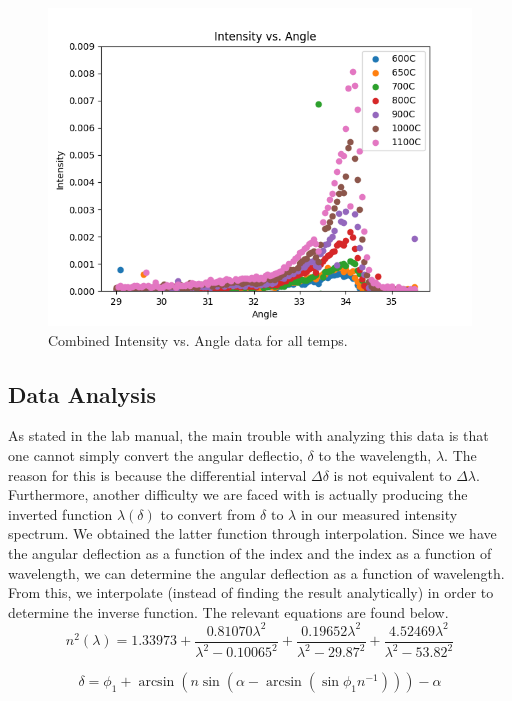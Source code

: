 \documentclass[10pt,letterpaper,onecolumn]{article}
\begin{document}
\begin{figure}[ht]
  \begin{center}
  \includegraphics*[width=4.5in]{combinedSpectra.png}
  \caption{Combined Intensity vs. Angle data for all temps.\label{fig:spectra} }
  \end{center}
 \end{figure}
 
\subsection{Data Analysis}
As stated in the lab manual, the main trouble with analyzing this data is that
one cannot simply convert the angular deflectio, $\delta$ to the 
wavelength, $\lambda$. The reason for this is because the differential interval
$\Delta \delta$ is not equivalent to $\Delta \lambda$. Furthermore, another 
difficulty we are faced with is actually producing the inverted function 
$\lambda(\delta)$ to convert from $\delta \text{ to } \lambda$ in our measured
intensity spectrum. We obtained the latter function through interpolation. 
Since we have the angular deflection as a function of the index and the index 
as a function of wavelength, we can  determine the angular deflection as a 
function of wavelength. From this, we interpolate (instead of finding the 
result analytically) in order to determine the inverse function. The relevant 
equations are found below. 
\begin{equation}
  n^2(\lambda) = 1.33973 + \frac{0.81070 \lambda^2}{\lambda^2 - 0.10065^2} + \frac{0.19652 \lambda^2}{\lambda^2 - 29.87^2} + \frac{4.52469 \lambda^2}{\lambda^2 - 53.82^2}
\end{equation}

\begin{equation}
  \delta = \phi_1 + \arcsin(n\sin(\alpha - \arcsin(\sin \phi_1 n^{-1}))) - \alpha
\end{equation}
\end{document}

